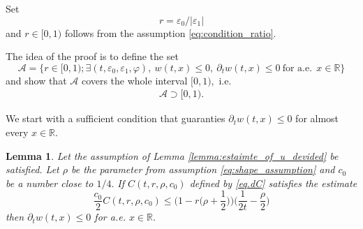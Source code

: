 \documentclass[reqno]{amsart}
\newtheorem{Lemma}[Theorem]{Lemma}
\begin{document}
Set 
	\[
	r = \varepsilon_0/|\varepsilon_1|
	\]
and $r\in [0,1)$ follows from the assumption \eqref{eq:condition_ratio}.

The idea of the proof is to define the set
\begin{equation}\label{eq.dA}
\mathcal{A}
= \{r \in [0,1); \exists (t,\varepsilon_0, \varepsilon_1, \varphi), \  w(t,x) \leq 0,\  \partial_t w(t,x) \leq 0 \ \mbox{for a.e.} \ \  x \in \mathbb{R} \}
\end{equation}
and show that $\mathcal{A}$ covers the whole interval $[0,1),$ i.e.
\begin{equation}\label{Asup}
    \begin{aligned}
        \mathcal{A} \supset [0,1).
    \end{aligned}
\end{equation}

We start with a sufficient condition that guaranties $\partial_t w(t,x) \leq 0$ for almost every $x \in \mathbb{R}.$
\begin{Lemma}
\label{lemma:condition_for_negative_speed}
Let the assumption of Lemma \ref{lemma:estaimte_of_u_devided}
be satisfied.
Let $\rho$ be the parameter from assumption \eqref{eq:shape_assumption}
and $c_0$ be a number close to $1/4.$
If $C(t,r,\rho,c_0)$ defined by \eqref{eq.dC} satisfies the estimate
	\begin{equation}\label{eq.a1}
	\frac{c_0}{2} C(t,r,\rho,c_0)
	\leq \bigg(1 - r \bigg( \rho + \frac{1}{2} \bigg) \bigg) \bigg( \frac{1}{2t} - \frac \rho 2 \bigg)
	\end{equation}
then $\partial_t w(t,x) \leq 0$ for a.e. $x \in \mathbb{R}.$
\end{Lemma}
\end{document}
